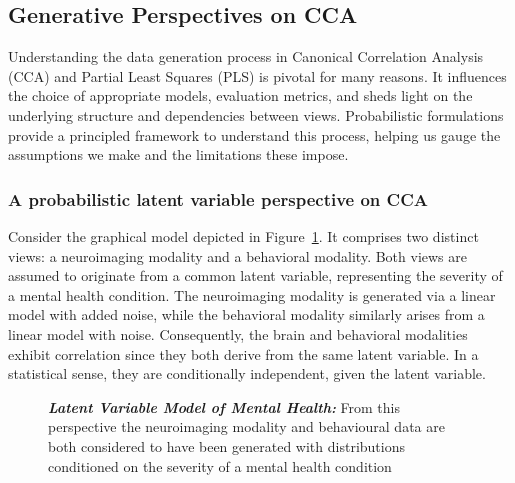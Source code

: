 \subsection{Generative Perspectives on CCA}\label{subsec:generative-perspectives-on-cca}
Understanding the data generation process in Canonical Correlation Analysis (CCA) and Partial Least Squares (PLS) is pivotal for many reasons.
It influences the choice of appropriate models, evaluation metrics, and sheds light on the underlying structure and dependencies between views.
Probabilistic formulations provide a principled framework to understand this process, helping us gauge the assumptions we make and the limitations these impose.

\subsubsection{A probabilistic latent variable perspective on CCA}\label{subsubsec:a-probabilistic-latent-variable-perspective-on-cca}

Consider the graphical model depicted in Figure~\ref{fig:mentalhealthselfsupervised}.
It comprises two distinct views: a neuroimaging modality and a behavioral modality.
Both views are assumed to originate from a common latent variable, representing the severity of a mental health condition.
The neuroimaging modality is generated via a linear model with added noise, while the behavioral modality similarly arises from a linear model with noise.
Consequently, the brain and behavioral modalities exhibit correlation since they both derive from the same latent variable.
In a statistical sense, they are conditionally independent, given the latent variable.

\begin{figure}
    \centering
    \caption[Latent Variable Model of Mental Health]{\textit{\textbf{Latent Variable Model of Mental Health:}} From this perspective the neuroimaging modality and behavioural data are both considered to have been generated with distributions conditioned on the severity of a mental health condition}\label{fig:mentalhealthselfsupervised}
\end{figure}

